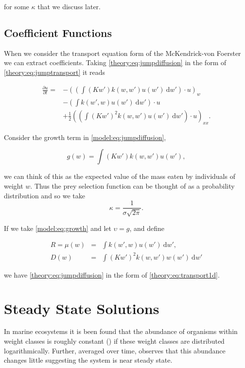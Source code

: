 \documentclass[../main]{subfiles}
\begin{document}
  for some $\kappa$ that we discuss later.

  \subsection{Coefficient Functions}
  When we consider the transport equation form of the McKendrick-von Foerster we can extract coefficients. Taking \autoref{theory:eq:jumpdiffusion} in the form of \autoref{theory:eq:jumptransport} it reads

  \begin{align}\label{model:eq:jumpdiffusion}
    \frac{\partial u}{\partial t} =
    & - \left( \left( \int (K w') k(w, w') u(w') \: \mathrm{d}w' \right) \cdot u \right)_w \nonumber \\
    & -  \left( \int k(w', w) u(w') \: \mathrm{d}w' \right) \cdot u \nonumber \\
    & + \frac{1}{2} \left( \left( \int (K w')^2 k(w, w') u(w') \: \mathrm{d}w' \right) \cdot u\right)_{xx}.
  \end{align}

  Consider the growth term in \autoref{model:eq:jumpdiffusion},

  \begin{equation}\label{model:eq:growth}
    g(w) = \int (K w') k(w, w') u(w'),
  \end{equation}

  we can think of this as the expected value of the mass eaten by individuals of weight $w$. Thus the prey selection function can be thought of as a probability distribution and so we take $$\kappa = \frac{1}{\sigma\sqrt{2 \pi}}.$$

  If we take \autoref{model:eq:growth} and let $\upsilon = g$, and define

  \begin{eqnarray}
    R = \mu(w)  &=& \int k(w', w) u(w') \: \mathrm{d}w', \\
    D(w)    &=& \int (K w')^2 k(w, w') w(w') \: \mathrm{d}w'
  \end{eqnarray}

  we have \autoref{theory:eq:jumpdiffusion} in the form of \autoref{theory:eq:transport1d}.

  \section{Steady State Solutions}
  In marine ecosystems it is been found that the abundance of organisms within weight classes is roughly constant (\cite{sheldon1972}) if these weight classes are distributed logarithmically. Further, averaged over time, \cite{datta2011} observes that this abundance changes little suggesting the system is near steady state.
\end{document}

